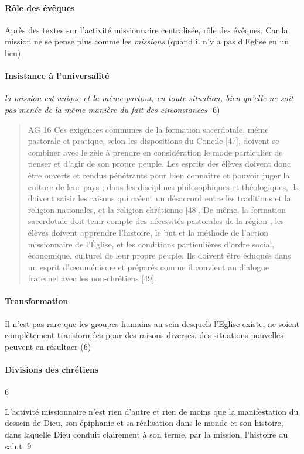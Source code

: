 \paragraph{Rôle des évêques} Après des textes sur l'activité missionnaire centralisée, rôle des évêques. Car la mission ne se pense plus comme les \textit{missions} (quand il n'y a pas d'Eglise en un lieu)

\paragraph{Insistance à l'universalité} \textit{la mission est unique et la même partout, en toute situation, bien qu'elle ne soit pas menée de la même manière du fait des circonstances} -6)

\begin{quote} AG 16
    Ces exigences communes de la formation sacerdotale, même pastorale et pratique, selon les dispositions du Concile [47], doivent se combiner avec le zèle à prendre en considération le mode particulier de penser et d’agir de son propre peuple. Les esprits des élèves doivent donc être ouverts et rendus pénétrants pour bien connaître et pouvoir juger la culture de leur pays ; dans les disciplines philosophiques et théologiques, ils doivent saisir les raisons qui créent un désaccord entre les traditions et la religion nationales, et la religion chrétienne [48]. De même, la formation sacerdotale doit tenir compte des nécessités pastorales de la région ; les élèves doivent apprendre l’histoire, le but et la méthode de l’action missionnaire de l’Église, et les conditions particulières d’ordre social, économique, culturel de leur propre peuple. Ils doivent être éduqués dans un esprit d’œcuménisme et préparés comme il convient au dialogue fraternel avec les non-chrétiens [49]. 
\end{quote}


\paragraph{Transformation} Il n'est pas rare que les groupes humains au sein desquels l'Eglise existe, ne soient complètement transformées pour des raisons diverses. des situations nouvelles peuvent en résultaer (6)

\paragraph{Divisions des chrétiens} 6

\begin{Synthesis}
    L’activité missionnaire n’est rien d’autre et rien de moins que la manifestation du dessein de Dieu, son épiphanie et sa réalisation dans le monde et son histoire, dans laquelle Dieu conduit clairement à son terme, par la mission, l’histoire du salut. 9
\end{Synthesis}
